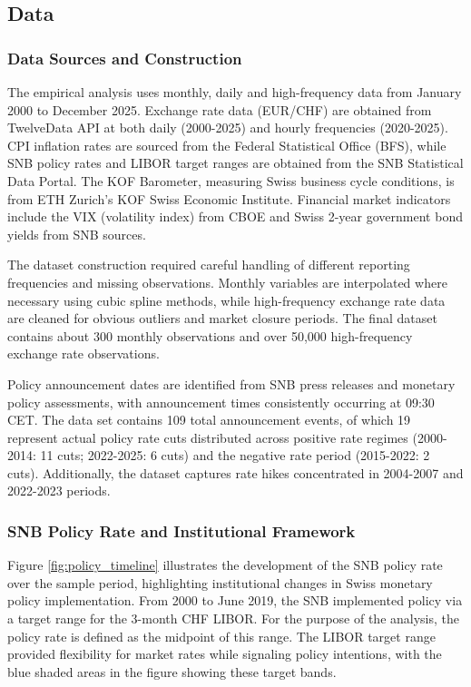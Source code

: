 \documentclass[12pt,a4paper]{article}
\begin{document}
\subsection{Data}
\label{subsec:empirical_data}

\subsubsection{Data Sources and Construction}

The empirical analysis uses monthly, daily and high-frequency data from January 2000 to December 2025. Exchange rate data (EUR/CHF) are obtained from TwelveData API at both daily (2000-2025) and hourly frequencies (2020-2025). CPI inflation rates are sourced from the Federal Statistical Office (BFS), while SNB policy rates and LIBOR target ranges are obtained from the SNB Statistical Data Portal. The KOF Barometer, measuring Swiss business cycle conditions, is from ETH Zurich's KOF Swiss Economic Institute. Financial market indicators include the VIX (volatility index) from CBOE and Swiss 2-year government bond yields from SNB sources.

The dataset construction required careful handling of different reporting frequencies and missing observations. Monthly variables are interpolated where necessary using cubic spline methods, while high-frequency exchange rate data are cleaned for obvious outliers and market closure periods. The final dataset contains about 300 monthly observations and over 50,000 high-frequency exchange rate observations.

Policy announcement dates are identified from SNB press releases and monetary policy assessments, with announcement times consistently occurring at 09:30 CET. The data set contains 109 total announcement events, of which 19 represent actual policy rate cuts distributed across positive rate regimes (2000-2014: 11 cuts; 2022-2025: 6 cuts) and the negative rate period (2015-2022: 2 cuts). Additionally, the dataset captures rate hikes concentrated in 2004-2007 and 2022-2023 periods.

\subsubsection{SNB Policy Rate and Institutional Framework}

Figure \ref{fig:policy_timeline} illustrates the development of the SNB policy rate over the sample period, highlighting institutional changes in Swiss monetary policy implementation. From 2000 to June 2019, the SNB implemented policy via a target range for the 3-month CHF LIBOR. For the purpose of the analysis, the policy rate is defined as the midpoint of this range. The LIBOR target range provided flexibility for market rates while signaling policy intentions, with the blue shaded areas in the figure showing these target bands.
\end{document}
